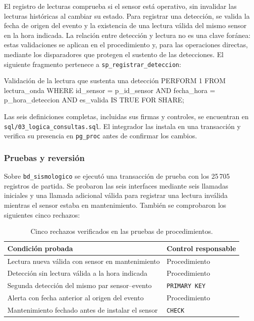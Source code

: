 \documentclass[12pt,a4paper]{article}
\begin{document}
El registro de lecturas comprueba si el sensor está operativo, sin
invalidar las lecturas históricas al cambiar su estado. Para registrar
una detección, se valida la fecha de origen del evento y la existencia
de una lectura válida del mismo sensor en la hora indicada. La
relación entre detección y lectura no es una clave foránea: estas
validaciones se aplican en el procedimiento y, para las operaciones
directas, mediante los disparadores que protegen el sustento de las
detecciones. El siguiente fragmento pertenece a
\nolinkurl{sp_registrar_deteccion}:

\begin{sqlbloque}{Validación de la lectura que sustenta una detección}
PERFORM 1
FROM lectura_onda
WHERE id_sensor = p_id_sensor
  AND fecha_hora = p_hora_deteccion
  AND es_valida IS TRUE
FOR SHARE;
\end{sqlbloque}

Las seis definiciones completas, incluidas sus firmas y controles,
se encuentran en \nolinkurl{sql/03_logica_consultas.sql}. El integrador
las instala en una transacción y verifica su presencia en
\texttt{pg\_proc} antes de confirmar los cambios.

\subsubsection*{Pruebas y reversión}

Sobre \texttt{bd\_sismologico} se ejecutó una transacción de prueba
con los 25\,705 registros de partida. Se probaron las seis interfaces
mediante seis llamadas iniciales y una llamada adicional válida para
registrar una lectura inválida mientras el sensor estaba en
mantenimiento. También se comprobaron los siguientes cinco rechazos:

\begin{table}[H]
\centering\small
\begin{tabular}{>{\raggedright\arraybackslash}p{10.05cm}>{\raggedright\arraybackslash}p{4.05cm}}
\toprule
\textbf{Condición probada} & \textbf{Control responsable} \\
\midrule
Lectura nueva válida con sensor en mantenimiento & Procedimiento \\
Detección sin lectura válida a la hora indicada & Procedimiento \\
Segunda detección del mismo par sensor--evento & \texttt{PRIMARY KEY} \\
Alerta con fecha anterior al origen del evento & Procedimiento \\
Mantenimiento fechado antes de instalar el sensor & \texttt{CHECK} \\
\bottomrule
\end{tabular}
\caption{Cinco rechazos verificados en las pruebas de procedimientos.}
\label{tab:pruebas-procedimientos-45}
\end{table}
\end{document}
